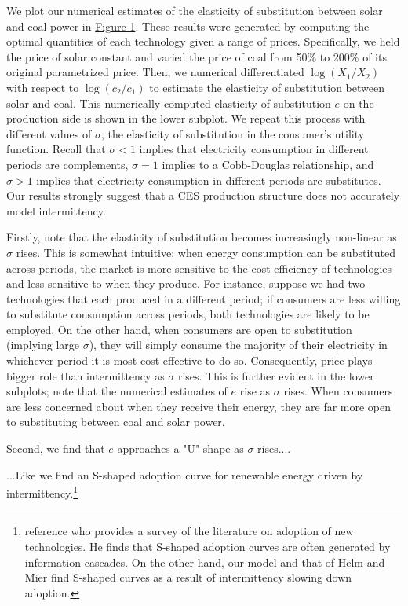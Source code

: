 \documentclass[11pt,a4paper]{extarticle}
\begin{document}
We plot our numerical estimates of the elasticity of substitution between solar and coal power in \hyperref[fig:eosnum]{Figure 1}. These results were generated by computing the optimal quantities of each technology given a range of prices. Specifically, we held the price of solar constant and varied the price of coal from 50\% to 200\% of its original parametrized price. Then, we numerical differentiated $\log(X_1/X_2)$ with respect to $\log(c_2/c_1)$ to estimate the elasticity of substitution between solar and coal. This numerically computed elasticity of substitution $e$ on the production side is shown in the lower subplot. We repeat this process with different values of $\sigma$, the elasticity of substitution in the consumer's utility function. Recall that $\sigma < 1$ implies that  electricity consumption in different periods are complements, $\sigma = 1$ implies to a Cobb-Douglas relationship, and $\sigma > 1$ implies that electricity consumption in different periods are substitutes. Our results strongly suggest that a CES production structure does not accurately model intermittency. 

Firstly, note that the elasticity of substitution becomes increasingly non-linear as $\sigma$ rises. This is somewhat intuitive; when energy consumption can be substituted across periods, the market is more sensitive to the cost efficiency of technologies and less sensitive to when they produce. For instance, suppose we had two technologies that each produced in a different period; if consumers are less willing to substitute consumption across periods, both technologies are likely to be  employed, On the other hand, when consumers are open to substitution (implying large $\sigma$), they will simply consume the majority of their electricity in whichever period it is most cost effective to do so. Consequently, price plays bigger role than intermittency as $\sigma$ rises. This is further evident in the lower subplots; note that the numerical estimates of  $e$ rise as $\sigma$ rises. When consumers are less concerned about when they receive their energy, they are far more open to substituting between coal and solar power. 

Second, we find that $e$ approaches a "U" shape as $\sigma$ rises.... 

...Like \cite{HH} we find an S-shaped adoption curve for renewable energy driven by intermittency.\footnote{\citet{HH} reference \citet{Geroski2000} who provides a survey of the literature on adoption of new technologies. He finds that S-shaped adoption curves are often generated by information cascades. On the other hand, our model and that of Helm and Mier find S-shaped curves as a result of intermittency slowing down adoption.} 
\end{document}
